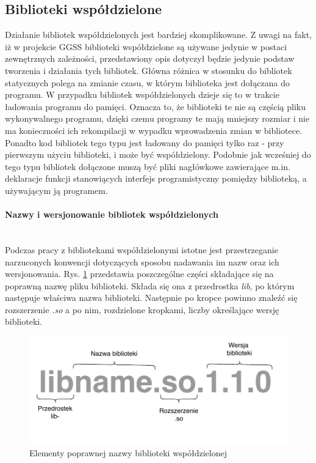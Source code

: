 
\subsection{Biblioteki współdzielone}
Działanie bibliotek współdzielonych jest bardziej skomplikowane. Z uwagi na fakt, iż w projekcie GGSS biblioteki współdzielone są używane jedynie w postaci zewnętrznych zależności, przedstawiony opis dotyczył będzie jedynie podstaw tworzenia i działania tych bibliotek. Główna różnica w stosunku do bibliotek statycznych polega na zmianie czasu, w którym biblioteka jest dołączana do programu. W przypadku bibliotek współdzielonych dzieje się to w trakcie ładowania programu do pamięci. Oznacza to, że biblioteki te nie są częścią pliku wykonywalnego programu, dzięki czemu programy te mają mniejszy rozmiar i nie ma konieczności ich rekompilacji w wypadku wprowadzenia zmian w bibliotece. Ponadto kod bibliotek tego typu jest ładowany do pamięci tylko raz - przy pierwszym użyciu biblioteki, i może być współdzielony. Podobnie jak wcześniej do tego typu bibliotek dołączone muszą być pliki nagłówkowe zawierające m.in. deklaracje funkcji stanowiących interfejs programistyczny pomiędzy biblioteką, a używającym ją programem.

\paragraph*{Nazwy i wersjonowanie bibliotek współdzielonych}\mbox{}\\
Podczas pracy z bibliotekami współdzielonymi istotne jest przestrzeganie narzuconych konwencji dotyczących sposobu nadawania im nazw oraz ich wersjonowania. Rys. \ref{fig:sharedName} przedstawia poszczególne części składające się na poprawną nazwę pliku biblioteki. Składa się ona z przedrostka \textit{lib}, po którym następuje właściwa nazwa biblioteki. Następnie po kropce powinno znaleźć się rozszerzenie \textit{.so} a po nim, rozdzielone kropkami, liczby określające wersję biblioteki. 

\begin{figure}[H]
\centering
\caption{Elementy poprawnej nazwy biblioteki współdzielonej}
\label{fig:sharedName}
\includegraphics[width=\textwidth]{res/sharedLibName}
\end{figure}

